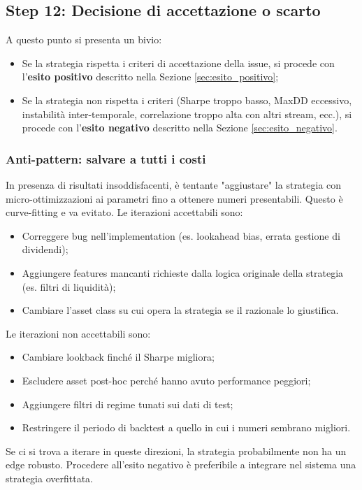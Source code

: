 \subsection{Step 12: Decisione di accettazione o scarto}

A questo punto si presenta un bivio:

\begin{itemize}
  \item Se la strategia rispetta i criteri di accettazione della issue, si procede con l'\textbf{esito positivo} descritto nella Sezione \ref{sec:esito_positivo};
  \item Se la strategia non rispetta i criteri (Sharpe troppo basso, MaxDD eccessivo, instabilità inter-temporale, correlazione troppo alta con altri stream, ecc.), si procede con l'\textbf{esito negativo} descritto nella Sezione \ref{sec:esito_negativo}.
\end{itemize}

\subsubsection{Anti-pattern: salvare a tutti i costi}

In presenza di risultati insoddisfacenti, è tentante "aggiustare" la strategia con micro-ottimizzazioni ai parametri fino a ottenere numeri presentabili. Questo è curve-fitting e va evitato. Le iterazioni accettabili sono:

\begin{itemize}
  \item Correggere bug nell'implementation (es. lookahead bias, errata gestione di dividendi);
  \item Aggiungere features mancanti richieste dalla logica originale della strategia (es. filtri di liquidità);
  \item Cambiare l'asset class su cui opera la strategia se il razionale lo giustifica.
\end{itemize}

Le iterazioni non accettabili sono:

\begin{itemize}
  \item Cambiare lookback finché il Sharpe migliora;
  \item Escludere asset post-hoc perché hanno avuto performance peggiori;
  \item Aggiungere filtri di regime tunati sui dati di test;
  \item Restringere il periodo di backtest a quello in cui i numeri sembrano migliori.
\end{itemize}

Se ci si trova a iterare in queste direzioni, la strategia probabilmente non ha un edge robusto. Procedere all'esito negativo è preferibile a integrare nel sistema una strategia overfittata.
